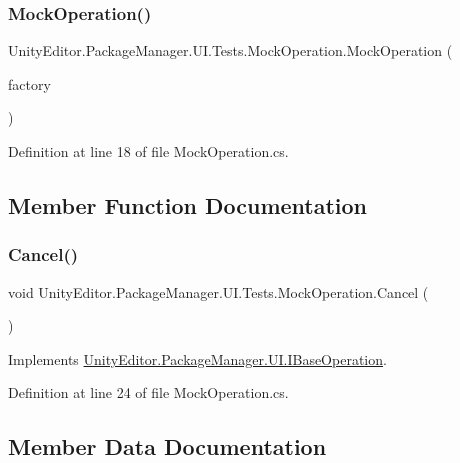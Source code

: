 \subsubsection{\texorpdfstring{MockOperation()}{MockOperation()}}
{\footnotesize\ttfamily Unity\+Editor.\+Package\+Manager.\+U\+I.\+Tests.\+Mock\+Operation.\+Mock\+Operation (\begin{DoxyParamCaption}\item[{\mbox{\hyperlink{class_unity_editor_1_1_package_manager_1_1_u_i_1_1_tests_1_1_mock_operation_factory}{Mock\+Operation\+Factory}}}]{factory }\end{DoxyParamCaption})\hspace{0.3cm}{\ttfamily [protected]}}



Definition at line 18 of file Mock\+Operation.\+cs.



\subsection{Member Function Documentation}
\mbox{\label{class_unity_editor_1_1_package_manager_1_1_u_i_1_1_tests_1_1_mock_operation_a8d5c37459e639081a1812925336e2756}} 
\subsubsection{\texorpdfstring{Cancel()}{Cancel()}}
{\footnotesize\ttfamily void Unity\+Editor.\+Package\+Manager.\+U\+I.\+Tests.\+Mock\+Operation.\+Cancel (\begin{DoxyParamCaption}{ }\end{DoxyParamCaption})}



Implements \mbox{\hyperlink{interface_unity_editor_1_1_package_manager_1_1_u_i_1_1_i_base_operation_ab924259fe1ff324c238ae37c96c42c1e}{Unity\+Editor.\+Package\+Manager.\+U\+I.\+I\+Base\+Operation}}.



Definition at line 24 of file Mock\+Operation.\+cs.



\subsection{Member Data Documentation}
\mbox{\label{class_unity_editor_1_1_package_manager_1_1_u_i_1_1_tests_1_1_mock_operation_a2fda81e2896b7efe70101dad2565bd9c}} 

